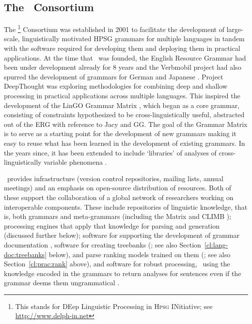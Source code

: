 \documentclass[output=paper,nonflat]{langsci/langscibook}
\begin{document}
\subsection{The \delphin\ Consortium}
\label{cl:delphin}

The \delphin\footnote{This stands for DEep Linguistic
  Processing in \textsc{Hpsg} INitiative; see \url{http://www.delph-in.net}} Consortium
was established in 2001 to facilitate the development of large-scale,
linguistically motivated HPSG grammars for multiple languages in tandem
with the software required for developing them and deploying them in
practical applications. At the time that \delphin\ was founded, the
English Resource Grammar
\citep[ERG;][]{Flickinger2000a,Flickinger2011a-u} had been under
development already for 8 years and the Verbmobil project
\citep{Wahlster2000a-ed} had also spurred the development of grammars for
German \citep[GG;][]{MK2000a-cr,Crysmann2003b} and Japanese
\citep[Jacy;][]{SBB2016a}. Project DeepThought
\citep{Callmeier-etal:2004} was exploring methodologies for combining
deep and shallow processing in practical applications across multiple
languages. This inspired the development of the LinGO Grammar Matrix
\citep{BFO2002a-u}, which began as a core grammar, consisting of
constraints hypothesized to be cross-linguistically useful, abstracted
out of the ERG with reference to Jacy and GG. The goal of the Grammar
Matrix is to serve as a starting point for the development of new
grammars making it easy to reuse what has been learned in the
development of existing grammars. In the years since, it has been
extended to include `libraries' of analyses of cross-linguistically
variable phenomena
\citep[\eg][]{Drellishak2009a-u,BDFPS2010a-u}.

\delphin\ provides infrastructure (version control repositories,
mailing lists, annual meetings) and an emphasis on open-source
distribution of resources. Both of these support the collaboration of a
global network of researchers working on interoperable
components. These include repositories of linguistic knowledge, that
is, both grammars and meta-grammars (including the Matrix and CLIMB
\citep{Fokkens:14}); processing engines that apply that
knowledge for parsing and generation (discussed further below);
software for supporting the development of grammar documentation
\citep[\eg][]{Hashimoto-etal:07}, software for creating treebanks
(\citealt{OFTM2004a-u,Packard:15}; see also Section~\ref{cl:lang-doc:treebanks} below), 
and parse ranking models trained on them
(\citealt{Tou:Man:Fli:Oep:05}; see also Section~\ref{cl:prac:rank} above), and
software for robust processing, \ie\ using the knowledge encoded in
the grammars to return analyses for sentences even if the grammar
deems them ungrammatical
\citep{W11-2923,buys2017parse,chen2018parse}.
\end{document}
